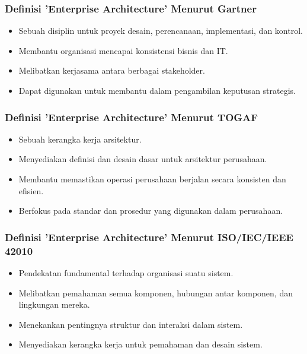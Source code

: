 \documentclass{beamer}
\begin{document}
	
	
	\begin{frame}
		\frametitle{Definisi 'Enterprise Architecture' Menurut Gartner}
		\begin{itemize}
			\item Sebuah disiplin untuk proyek desain, perencanaan, implementasi, dan kontrol.
			\item Membantu organisasi mencapai konsistensi bisnis dan IT.
			\item Melibatkan kerjasama antara berbagai stakeholder.
			\item Dapat digunakan untuk membantu dalam pengambilan keputusan strategis.
		\end{itemize}
	\end{frame}
	
	\begin{frame}
		\frametitle{Definisi 'Enterprise Architecture' Menurut TOGAF}
		\begin{itemize}
			\item Sebuah kerangka kerja arsitektur.
			\item Menyediakan definisi dan desain dasar untuk arsitektur perusahaan.
			\item Membantu memastikan operasi perusahaan berjalan secara konsisten dan efisien.
			\item Berfokus pada standar dan prosedur yang digunakan dalam perusahaan.
		\end{itemize}
	\end{frame}
	
	\begin{frame}
		\frametitle{Definisi 'Enterprise Architecture' Menurut ISO/IEC/IEEE 42010}
		\begin{itemize}
			\item Pendekatan fundamental terhadap organisasi suatu sistem.
			\item Melibatkan pemahaman semua komponen, hubungan antar komponen, dan lingkungan mereka.
			\item Menekankan pentingnya struktur dan interaksi dalam sistem.
			\item Menyediakan kerangka kerja untuk pemahaman dan desain sistem.
		\end{itemize}
	\end{frame}
	
\end{document}
